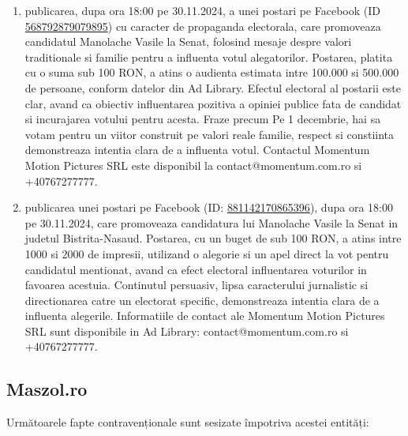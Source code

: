 \documentclass[a4paper,12pt]{article}
\begin{document}
\begin{enumerate}[leftmargin=*, label=\arabic*.)]
    \item publicarea, dupa ora 18:00 pe 30.11.2024, a unei postari pe Facebook (ID \href{https://www.facebook.com/ads/library/?id=568792879079895}{568792879079895}) cu caracter de propaganda electorala, care promoveaza candidatul Manolache Vasile la Senat, folosind mesaje despre valori traditionale si familie pentru a influenta votul alegatorilor. Postarea, platita cu o suma sub 100 RON, a atins o audienta estimata intre 100.000 si 500.000 de persoane, conform datelor din Ad Library.  Efectul electoral al postarii este clar, avand ca obiectiv influentarea pozitiva a opiniei publice fata de candidat si incurajarea votului pentru acesta.  Fraze precum Pe 1 decembrie, hai sa votam pentru un viitor construit pe valori reale  familie, respect si constiinta demonstreaza intentia clara de a influenta votul.  Contactul Momentum Motion Pictures SRL este disponibil la contact@momentum.com.ro si +40767277777.
    \item publicarea unei postari pe Facebook (ID: \href{https://www.facebook.com/ads/library/?id=881142170865396}{881142170865396}), dupa ora 18:00 pe 30.11.2024, care promoveaza candidatura lui Manolache Vasile la Senat in judetul Bistrita-Nasaud. Postarea, cu un buget de sub 100 RON, a atins intre 1000 si 2000 de impresii, utilizand o alegorie si un apel direct la vot pentru candidatul mentionat, avand ca efect electoral influentarea voturilor in favoarea acestuia.  Continutul persuasiv, lipsa caracterului jurnalistic si directionarea catre un electorat specific, demonstreaza intentia clara de a influenta alegerile.  Informatiile de contact ale Momentum Motion Pictures SRL sunt disponibile in Ad Library: contact@momentum.com.ro si +40767277777.
\end{enumerate}

\vspace{0.5cm}

\subsection{Maszol.ro}
Următoarele fapte contravenționale sunt sesizate împotriva acestei entități:
\end{document}
